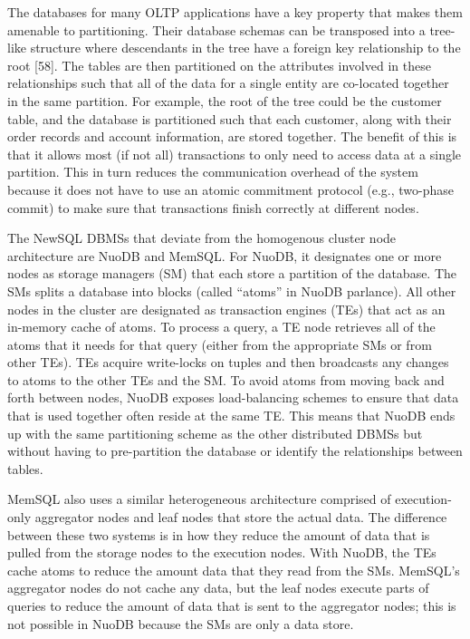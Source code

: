 \documentclass[a4paper,11pt,twoside,openright]{article}
\begin{document}
The databases for many OLTP applications have a key property that makes
them amenable to partitioning. Their database schemas can be transposed
into a tree-like structure where descendants in the tree have a foreign
key relationship to the root {[}58{]}. The tables are then partitioned
on the attributes involved in these relationships such that all of the
data for a single entity are co-located together in the same partition.
For example, the root of the tree could be the customer table, and the
database is partitioned such that each customer, along with their order
records and account information, are stored together. The benefit of
this is that it allows most (if not all) transactions to only need to
access data at a single partition. This in turn reduces the
communication overhead of the system because it does not have to use an
atomic commitment protocol (e.g., two-phase commit) to make sure that
transactions finish correctly at different nodes.

The NewSQL DBMSs that deviate from the homogenous cluster node
architecture are NuoDB and MemSQL. For NuoDB, it designates one or more
nodes as storage managers (SM) that each store a partition of the
database. The SMs splits a database into blocks (called ``atoms'' in
NuoDB parlance). All other nodes in the cluster are designated as
transaction engines (TEs) that act as an in-memory cache of atoms. To
process a query, a TE node retrieves all of the atoms that it needs for
that query (either from the appropriate SMs or from other TEs). TEs
acquire write-locks on tuples and then broadcasts any changes to atoms
to the other TEs and the SM. To avoid atoms from moving back and forth
between nodes, NuoDB exposes load-balancing schemes to ensure that data
that is used together often reside at the same TE. This means that NuoDB
ends up with the same partitioning scheme as the other distributed DBMSs
but without having to pre-partition the database or identify the
relationships between tables.

MemSQL also uses a similar heterogeneous architecture comprised of
execution-only aggregator nodes and leaf nodes that store the actual
data. The difference between these two systems is in how they reduce the
amount of data that is pulled from the storage nodes to the execution
nodes. With NuoDB, the TEs cache atoms to reduce the amount data that
they read from the SMs. MemSQL's aggregator nodes do not cache any data,
but the leaf nodes execute parts of queries to reduce the amount of data
that is sent to the aggregator nodes; this is not possible in NuoDB
because the SMs are only a data store.
\end{document}
